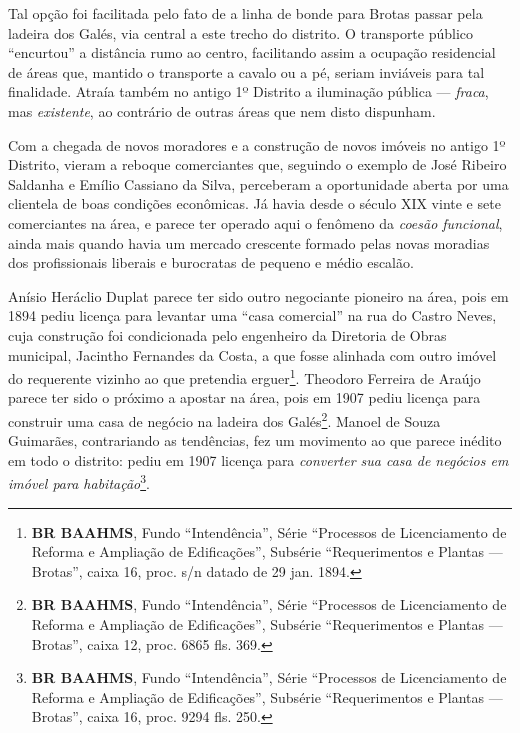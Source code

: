 
Tal opção foi facilitada pelo fato de a linha de bonde para Brotas passar pela ladeira dos Galés, via central a este trecho do distrito. O transporte público ``encurtou'' a distância rumo ao centro, facilitando assim a ocupação residencial de áreas que, mantido o transporte a cavalo ou a pé, seriam inviáveis para tal finalidade. Atraía também no antigo 1º Distrito a iluminação pública --- \textit{fraca}, mas \textit{existente}, ao contrário de outras áreas que nem disto dispunham.


Com a chegada de novos moradores e a construção de novos imóveis no antigo 1º Distrito, vieram a reboque comerciantes que, seguindo o exemplo de José Ribeiro Saldanha e Emílio Cassiano da Silva, perceberam a oportunidade aberta por uma clientela de boas condições econômicas. Já havia desde o século XIX vinte e sete comerciantes na área, e parece ter operado aqui o fenômeno da \textit{coesão funcional}, ainda mais quando havia um mercado crescente formado pelas novas moradias dos profissionais liberais e burocratas de pequeno e médio escalão.

Anísio Heráclio Duplat parece ter sido outro negociante pioneiro na área, pois em 1894 pediu licença para levantar uma ``casa comercial'' na rua do Castro Neves, cuja construção foi condicionada pelo engenheiro da Diretoria de Obras municipal, Jacintho Fernandes da Costa, a que fosse alinhada com outro imóvel do requerente vizinho ao que pretendia erguer\footnote{\textbf{BR BAAHMS}, Fundo ``Intendência'', Série ``Processos de Licenciamento de Reforma e Ampliação de Edificações'', Subsérie ``Requerimentos e Plantas --- Brotas'', caixa 16, proc. s/n datado de 29 jan. 1894.}. Theodoro Ferreira de Araújo parece ter sido o próximo a apostar na área, pois em 1907 pediu licença para construir uma casa de negócio na ladeira dos Galés\footnote{\textbf{BR BAAHMS}, Fundo ``Intendência'', Série ``Processos de Licenciamento de Reforma e Ampliação de Edificações'', Subsérie ``Requerimentos e Plantas --- Brotas'', caixa 12, proc. 6865 fls. 369.}. Manoel de Souza Guimarães, contrariando as tendências, fez um movimento ao que parece inédito em todo o distrito: pediu em 1907 licença para \textit{converter sua casa de negócios em imóvel para habitação}\footnote{\textbf{BR BAAHMS}, Fundo ``Intendência'', Série ``Processos de Licenciamento de Reforma e Ampliação de Edificações'', Subsérie ``Requerimentos e Plantas --- Brotas'', caixa 16, proc. 9294 fls. 250.}.

